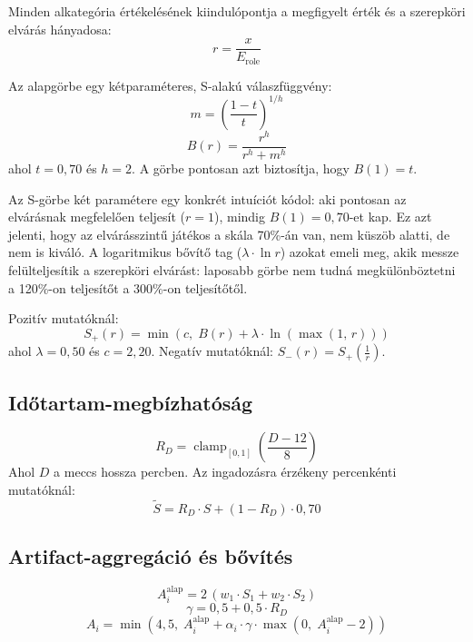 Minden alkategória értékelésének kiindulópontja a megfigyelt érték és a szerepköri elvárás hányadosa:
\begin{equation}
r = \frac{x}{E_{\text{role}}}
\end{equation}

Az alapgörbe egy kétparaméteres, S-alakú válaszfüggvény:
\begin{equation}
m = \left(\frac{1-t}{t}\right)^{1/h}
\end{equation}
\begin{equation}
B(r) = \frac{r^h}{r^h + m^h}
\end{equation}
ahol $t = 0{,}70$ és $h = 2$. A görbe pontosan azt biztosítja, hogy $B(1) = t$.

Az S-görbe két paramétere egy konkrét intuíciót kódol: aki pontosan az elvárásnak megfelelően teljesít ($r=1$), mindig $B(1) = 0{,}70$-et kap. Ez azt jelenti, hogy az elvárásszintű játékos a skála 70\%-án van, nem küszöb alatti, de nem is kiváló. A logaritmikus bővítő tag ($\lambda \cdot \ln r$) azokat emeli meg, akik messze felülteljesítik a szerepköri elvárást: laposabb görbe nem tudná megkülönböztetni a 120\%-on teljesítőt a 300\%-on teljesítőtől.

Pozitív mutatóknál:
\begin{equation}
S_+(r) = \min\!\left(c,\; B(r) + \lambda \cdot \ln\!\left(\max(1,\, r)\right)\right)
\end{equation}
ahol $\lambda = 0{,}50$ és $c = 2{,}20$. Negatív mutatóknál: $S_-(r) = S_+\!\left(\frac{1}{r}\right)$.

\subsection{Időtartam-megbízhatóság}

\begin{equation}
R_D = \operatorname{clamp}_{[0,1]}\!\left(\frac{D - 12}{8}\right)
\end{equation}
Ahol $D$ a meccs hossza percben. Az ingadozásra érzékeny percenkénti mutatóknál:
\begin{equation}
\tilde{S} = R_D \cdot S + (1 - R_D) \cdot 0{,}70
\end{equation}

\subsection{Artifact-aggregáció és bővítés}

\begin{equation}
A_i^{\text{alap}} = 2\,(w_1 \cdot S_1 + w_2 \cdot S_2)
\end{equation}
\begin{equation}
\gamma = 0{,}5 + 0{,}5 \cdot R_D
\end{equation}
\begin{equation}
A_i = \min\!\left(4{,}5,\; A_i^{\text{alap}} + \alpha_i \cdot \gamma \cdot \max\!\left(0,\; A_i^{\text{alap}} - 2\right)\right)
\end{equation}

